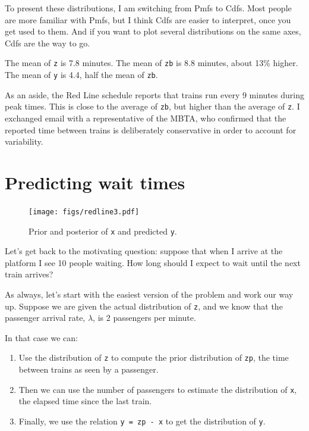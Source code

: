 \documentclass[12pt]{book}
\theoremstyle{exercise}
\begin{document}
To present these distributions, I am switching from Pmfs to Cdfs.
Most people are more familiar with Pmfs, but I think Cdfs are easier
to interpret, once you get used to them.  And if you want to plot
several distributions on the same axes, Cdfs are the way to go.

The mean of {\tt z} is 7.8 minutes.  The mean of {\tt zb} is 8.8
minutes, about 13\% higher.  The mean of {\tt y} is 4.4, half
the mean of {\tt zb}.

As an aside, the Red Line schedule reports that trains run every
9 minutes during peak times.  This is close to the average of
{\tt zb}, but higher than the average of {\tt z}.  I exchanged email
with a representative of the MBTA, who confirmed that the reported
time between trains is deliberately conservative in order to
account for variability.


\section{Predicting wait times}
\label{elapsed}

\begin{figure}
\centerline{\texttt{[image: figs/redline3.pdf]}}
\caption{Prior and posterior of {\tt x} and predicted {\tt y}. }
\label{fig.redline3}
\end{figure}

Let's get back to the motivating question: suppose that when
I arrive at the platform I see 10 people waiting.
How long should I expect to wait until the next train arrives?

As always, let's start with the easiest version of the problem
and work our way up.  Suppose we are given the actual distribution of
{\tt z}, and we know that the passenger arrival rate,
$\lambda$, is 2 passengers per minute.

In that case we can:

\begin{enumerate}

\item Use the distribution of {\tt z} to compute
the prior distribution of {\tt zp}, the time between trains
as seen by a passenger.

\item Then we can use the number of passengers to estimate the distribution
of {\tt x}, the elapsed time since the last train.

\item Finally, we use the relation {\tt y = zp - x} to get the
distribution of {\tt y}.

\end{enumerate}
\end{document}
